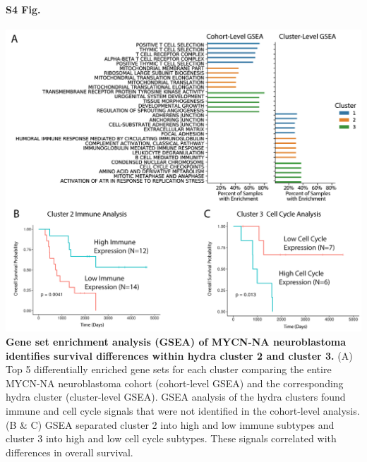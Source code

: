 \documentclass[10pt,letterpaper]{article}
\begin{document}
\paragraph*{S4 Fig.}
\includegraphics[width=\textwidth]{img/SubCluster-Analysis-V2@2x.png}
\label{S4_Fig} {\bf Gene set enrichment analysis (GSEA) of MYCN-NA neuroblastoma identifies survival differences within hydra cluster 2 and cluster 3.} (A) Top 5 differentially enriched gene sets for each cluster comparing the entire MYCN-NA neuroblastoma cohort (cohort-level GSEA) and the corresponding hydra cluster (cluster-level GSEA). GSEA analysis of the hydra clusters found immune and cell cycle signals that were not identified in the cohort-level analysis. (B \& C) GSEA separated cluster 2 into high and low immune subtypes and cluster 3 into high and low cell cycle subtypes. These signals correlated with differences in overall survival. 
\end{document}
